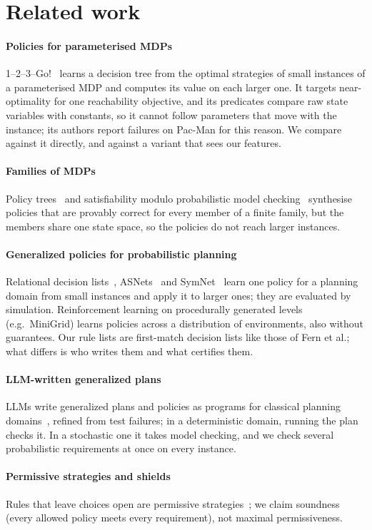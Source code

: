 \section{Related work}\label{sec:related}

\paragraph*{Policies for parameterised MDPs}
1--2--3--Go!~\cite{azeem2025onetwothreego} learns a decision tree from the optimal strategies of small instances of a
parameterised MDP and computes its value on each larger one. It targets near-optimality for one reachability
objective, and its predicates compare raw state variables with constants, so it cannot follow parameters that move
with the instance; its authors report failures on Pac-Man for this reason. We compare against it directly, and
against a variant that sees our features.

\paragraph*{Families of MDPs}
Policy trees~\cite{andriushchenko2024trees} and satisfiability modulo probabilistic model
checking~\cite{heck2026smpmc} synthesise policies that are provably correct for every member of a finite family, but
the members share one state space, so the policies do not reach larger instances.

\paragraph*{Generalized policies for probabilistic planning}
Relational decision lists~\cite{fern2006api,yoon2002inductive}, ASNets~\cite{toyer2020asnets} and
SymNet~\cite{garg2020symnet} learn one policy for a planning domain from small instances and apply it to larger ones;
they are evaluated by simulation. Reinforcement learning on procedurally generated levels (e.g.\ MiniGrid) learns
policies across a distribution of environments, also without guarantees. Our rule lists are first-match decision
lists like those of Fern et al.; what differs is who writes them and what certifies them.

\paragraph*{LLM-written generalized plans}
LLMs write generalized plans and policies as programs for classical planning
domains~\cite{silver2024generalized,stein2026strategy}, refined from test failures; in a deterministic domain, running
the plan checks it. In a stochastic one it takes model checking, and we check several probabilistic requirements at
once on every instance.

\paragraph*{Permissive strategies and shields}
Rules that leave choices open are permissive strategies~\cite{drager2015permissive}; we claim soundness (every allowed
policy meets every requirement), not maximal permissiveness.
